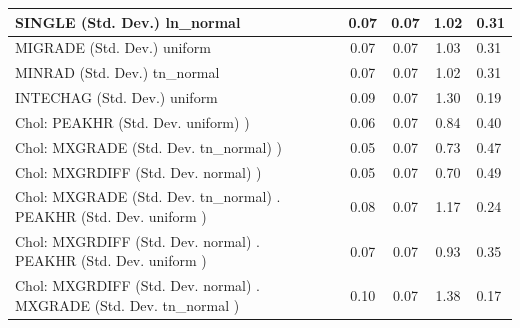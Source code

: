 \begin{table}
\begin{center}
\begin{tabular}{|l|l|c|c|c|l|}
			\hline
			SINGLE (Std. Dev.) ln_normal &  & 0.07 & 0.07 & 1.02 & 0.31 \\
			\hline
			MIGRADE (Std. Dev.) uniform &  & 0.07 & 0.07 & 1.03 & 0.31 \\
			\hline
			MINRAD (Std. Dev.) tn_normal &  & 0.07 & 0.07 & 1.02 & 0.31 \\
			\hline
			INTECHAG (Std. Dev.) uniform &  & 0.09 & 0.07 & 1.30 & 0.19 \\
			\hline
			 Chol: PEAKHR (Std. Dev. uniform) ) &  & 0.06 & 0.07 & 0.84 & 0.40 \\
			\hline
			 Chol: MXGRADE (Std. Dev. tn_normal) ) &  & 0.05 & 0.07 & 0.73 & 0.47 \\
			\hline
			 Chol: MXGRDIFF (Std. Dev. normal) ) &  & 0.05 & 0.07 & 0.70 & 0.49 \\
			\hline
			 Chol: MXGRADE (Std. Dev. tn_normal) . PEAKHR (Std. Dev.   uniform ) &  & 0.08 & 0.07 & 1.17 & 0.24 \\
			\hline
			 Chol: MXGRDIFF (Std. Dev. normal) . PEAKHR (Std. Dev.   uniform ) &  & 0.07 & 0.07 & 0.93 & 0.35 \\
			\hline
			 Chol: MXGRDIFF (Std. Dev. normal) . MXGRADE (Std. Dev.   tn_normal ) &  & 0.10 & 0.07 & 1.38 & 0.17 \\
			\hline
		\end{tabular}
	\end{center}
\end{table}